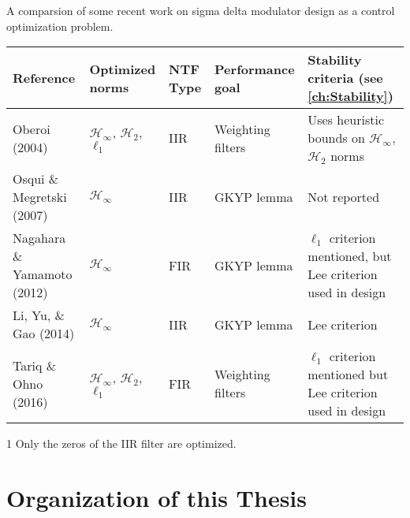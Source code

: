 \begin{threeparttable}
	\caption{A comparsion of some recent work on sigma delta modulator design as a control optimization problem.} \label{tab:related}
	\begin{tabularx}{\textwidth}{X P{1.9cm} P{0.6cm} P{1.9cm} P{3.2cm}}
		\toprule
		\textbf{Reference} & \textbf{Optimized norms} & \textbf{\gls{NTF} Type} & \textbf{Performance goal} & \textbf{Stability criteria (see \autoref{ch:Stability})} \\
		\midrule
		Oberoi (2004) \cite{Oberoi2004} & $\mathcal{H}_\infty$, $\mathcal{H}_2$, $\ell_1$ &\gls{IIR} &  Weighting filters & Uses heuristic bounds on $\mathcal{H}_\infty$, $\mathcal{H}_2$ norms \\
		Osqui \& Megretski (2007) \cite{Osqui2007} & $\mathcal{H}_\infty$ & \gls{IIR} & \gls{GKYP} lemma & Not reported \\
		Nagahara \& Yamamoto (2012) \cite{Nagahara2012} & $\mathcal{H}_\infty$ & \gls{FIR} & \gls{GKYP} lemma & $\ell_1$ criterion mentioned, but Lee criterion used in design \\
		Li, Yu, \& Gao (2014) \cite{Li2014} & $\mathcal{H}_\infty$ & \gls{IIR} & \gls{GKYP} lemma & Lee criterion \\
		Tariq \& Ohno (2016) \cite{Tariq2016} & $\mathcal{H}_\infty$, $\mathcal{H}_2$, $\ell_1$ & \gls{FIR} & Weighting filters & $\ell_1$ criterion mentioned but Lee criterion used in design \\
		\bottomrule
	\end{tabularx}
	\begin{tablenotes}
		\item[1] Only the zeros of the \gls{IIR} filter are optimized.
	\end{tablenotes}
	
\end{threeparttable}

\section{Organization of this Thesis}
\label{sec:in-org}

